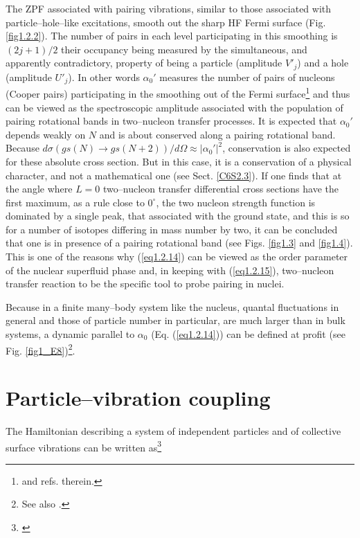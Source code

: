 The ZPF associated with pairing vibrations, similar to those associated with particle--hole--like excitations,  smooth out the sharp HF Fermi surface (Fig. \ref{fig1.2.2}). The number of pairs in each level participating in this smoothing is $(2j+1)/2$ their occupancy being measured by the simultaneous, and apparently contradictory, property of being a particle (amplitude $V'_j$) and a hole (amplitude $U'_j$). In other words $\alpha_0'$ measures the number of pairs of nucleons (Cooper pairs) participating in the smoothing out of the Fermi surface\footnote{\cite{Schrieffer:64,Potel:17} and refs. therein.} and thus can be viewed as the spectroscopic amplitude associated with the population of pairing rotational bands in two--nucleon transfer processes. It is expected that $\alpha_0'$ depends weakly on $N$ and is about conserved along a pairing rotational band. Because $d\sigma(gs(N)\rightarrow gs(N+2))/d\Omega\approx|\alpha_0'|^2$, conservation is also expected for these absolute cross section. But in this case, it is a conservation of a physical character, and not a mathematical one (see Sect. \ref{C6S2.3}). If one finds that at the angle where $L=0$ two--nucleon transfer differential cross sections have the first maximum, as a rule close to $0^\circ$, the two nucleon strength function is dominated by a single peak, that associated with the ground state, and this is so for a number of isotopes differing in mass number by two, it can be concluded that one is in presence of a pairing rotational band (see Figs. \ref{fig1.3} and \ref{fig1.4}). This is one of the reasons why (\ref{eq1.2.14}) can be viewed as the order parameter of the nuclear superfluid phase and, in keeping with (\ref{eq1.2.15}), two--nucleon transfer reaction to be the specific tool to probe pairing in nuclei.

Because in a finite many--body system like the nucleus, quantal fluctuations in general and those of particle number in particular, are much larger than in bulk systems, a dynamic parallel to $\alpha_0$ (Eq. (\ref{eq1.2.14})) can be defined at profit (see Fig. \ref{fig1_E8})\footnote{See also \cite{Potel:17}.}. 
\section{Particle--vibration coupling}\label{appintroD}
The Hamiltonian describing a system of independent particles and of collective surface vibrations can be written as\footnote{\cite{Bohr:75,Brink:05}}

